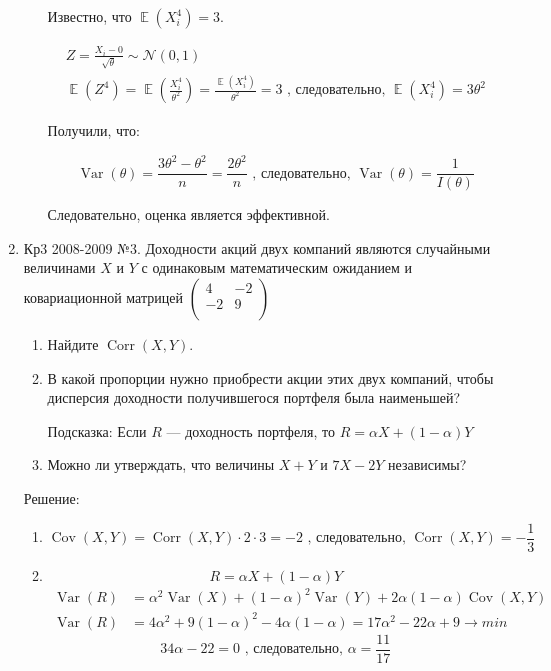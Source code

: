 \documentclass[a4paper,11pt]{article}
\DeclareMathOperator{\Var}{Var}
\DeclareMathOperator{\Cov}{Cov}
\DeclareMathOperator{\Corr}{Corr}
\DeclareMathOperator{\E}{\mathbb{E}}
\newcommand{\cN}{\mathcal{N}}
\begin{document}
\begin{enumerate}
\begin{enumerate}
Известно, что $\E (X_i^4) = 3$. 

\begin{align*}
Z = \frac{X_i - 0}{\sqrt{\theta}} \sim \cN(0,1) \\
\E (Z^4) = \E \left (\frac{X_i^4}{\theta^2} \right) = \frac{\E (X_i^4)}{\theta^2} =3 \text{ , следовательно, } \E (X_i^4) = 3 \theta^2
\end{align*}

Получили, что:

\[
\Var (\theta) = \frac{3\theta^2 - \theta^2}{n} = \frac{2\theta^2}{n} \text{ , следовательно, } \Var(\theta) = \frac{1}{I(\theta)} 
\]

Следовательно, оценка является эффективной.
\end{enumerate}

\item Кр3 2008-2009 №3. Доходности акций двух компаний являются случайными величинами $X$ и $Y$ с одинаковым математическим ожиданием и ковариационной матрицей $\left( \begin{array}{cc}
   4 & -2  \\
   -2 & 9  \\
\end{array}\right)$ \label{Кр3 2008-2009 №3}
\begin{enumerate}
\item Найдите $\Corr(X,Y)$.
\item В какой пропорции нужно приобрести акции этих двух компаний, чтобы дисперсия доходности получившегося портфеля была наименьшей?

Подсказка: Если $R$ — доходность портфеля, то $R=\alpha X+(1-\alpha)Y$
\item Можно ли утверждать, что величины $X+Y$ и $7X-2Y$ независимы?
\end{enumerate}

Решение:

\begin{enumerate}
\item
\[
\Cov(X,Y) = \Corr(X,Y) \cdot 2 \cdot 3 = -2 \text{ , следовательно, } \Corr(X,Y) = -\frac{1}{3}
\]

\item

\[
R = \alpha X + (1-\alpha) Y 
\]
\begin{align*}
\Var(R) &= \alpha^2 \Var(X) + (1-\alpha)^2 \Var(Y) + 2 \alpha (1 - \alpha) \Cov(X,Y) \\
\Var(R) &= 4\alpha^2 + 9 (1-\alpha)^2 - 4\alpha (1-\alpha) = 17\alpha^2 - 22\alpha + 9     \rightarrow min
\end{align*}
\[
34 \alpha - 22 = 0 \text{ , следовательно, } \alpha = \frac{11}{17} 
\]


\end{enumerate}
\end{enumerate}
\end{document}
